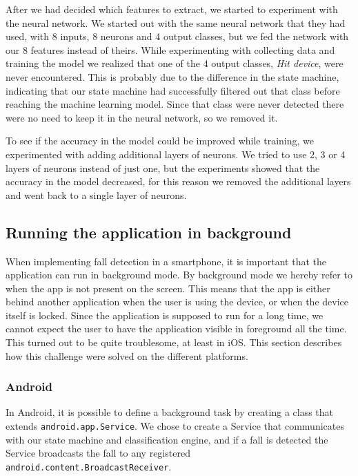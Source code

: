 \documentclass[12pt, a4paper, onecolumn]{article}
\begin{document}
	After we had decided which features to extract, we started to experiment with the neural network. We started out with the same neural network that they had used, with 8 inputs, 8 neurons and 4 output classes, but we fed the network with our 8 features instead of theirs. While experimenting with collecting data and training the model we realized that one of the 4 output classes, \textit{Hit device}, were never encountered. This is probably due to the difference in the state machine, indicating that our state machine had successfully filtered out that class before reaching the machine learning model. Since that class were never detected there were no need to keep it in the neural network, so we removed it.
	
	To see if the accuracy in the model could be improved while training, we experimented with adding additional layers of neurons. We tried to use 2, 3 or 4 layers of neurons instead of just one, but the experiments showed that the accuracy in the model decreased, for this reason we removed the additional layers and went back to a single layer of neurons.
	
	\subsection{Running the application in background}
	
	When implementing fall detection in a smartphone, it is important that the application can run in background mode. By background mode we hereby refer to when the app is not present on the screen. This means that the app is either behind another application when the user is using the device, or when the device itself is locked. Since the application is supposed to run for a long time, we cannot expect the user to have the application visible in foreground all the time. This turned out to be quite troublesome, at least in iOS. This section describes how this challenge were solved on the different platforms.
	
	\subsubsection{Android}
	
	In Android, it is possible to define a background task by creating a class that extends \texttt{android.app.Service}. We chose to create a Service that communicates with our state machine and classification engine, and if a fall is  detected the Service broadcasts the fall to any registered  \texttt{android.content.BroadcastReceiver}.
	
\end{document}
